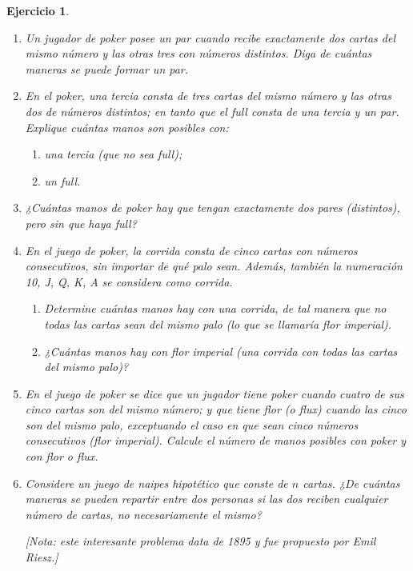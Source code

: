 \documentclass[12pt,twoside]{article}
\newtheorem{Ejer}{Ejercicio}
\begin{document}
\begin{Ejer}
\begin{enumerate}

\item Un jugador de poker posee un par cuando recibe exactamente dos cartas del mismo número y las otras tres con números distintos. Diga de cuántas maneras se puede formar un par.

\item En el poker, una tercia consta de tres cartas del mismo número y las otras dos de números distintos; en tanto que el full consta de una tercia y un par. Explique cuántas manos son posibles con:
\begin{enumerate}
\item una tercia (que no sea full);
\item un full.
\end{enumerate}

\item ¿Cuántas manos de poker hay que tengan exactamente dos pares (distintos), pero sin que haya full?

\item En el juego de poker, la corrida consta de cinco cartas con números consecutivos, sin importar de qué palo sean. Además, también la numeración 10, J, Q, K, A se considera como corrida.
\begin{enumerate}
\item Determine cuántas manos hay con una corrida, de tal manera que no todas las cartas sean del mismo palo (lo que se llamaría flor imperial).
\item ¿Cuántas manos hay con flor imperial (una corrida con todas las cartas del mismo palo)?
\end{enumerate}

\item En el juego de poker se dice que un jugador tiene poker cuando cuatro de sus cinco cartas son del mismo número; y que tiene flor (o flux) cuando las cinco son del mismo palo, exceptuando el caso en que sean cinco números consecutivos (flor imperial). Calcule el número de manos posibles con poker y con flor o flux.

\item Considere un juego de naipes hipotético que conste de $n$ cartas. ¿De cuántas maneras se pueden repartir entre dos personas si las dos reciben cualquier número de cartas, no necesariamente el mismo? 

[Nota: este interesante problema data de 1895 y fue propuesto por Emil Riesz.]


\end{enumerate}
\end{Ejer}
\end{document}
